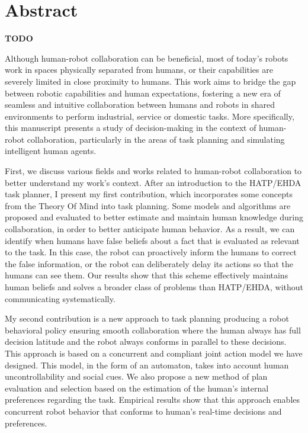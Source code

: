 \chapter*{Abstract}


\textbf{TODO}

Although human-robot collaboration can be beneficial, most of today's robots work in spaces physically separated from humans, or their capabilities are severely limited in close proximity to humans. This work aims to bridge the gap between robotic capabilities and human expectations, fostering a new era of seamless and intuitive collaboration between humans and robots in shared environments to perform industrial, service or domestic tasks. More specifically, this manuscript presents a study of decision-making in the context of human-robot collaboration, particularly in the areas of task planning and simulating intelligent human agents.

First, we discuss various fields and works related to human-robot collaboration to better understand my work's context. After an introduction to the HATP/EHDA task planner, I present my first contribution, which incorporates some concepts from the Theory Of Mind into task planning. Some models and algorithms are proposed and evaluated to better estimate and maintain human knowledge during collaboration, in order to better anticipate human behavior. As a result, we can identify when humans have false beliefs about a fact that is evaluated as relevant to the task. In this case, the robot can proactively inform the humans to correct the false information, or the robot can deliberately delay its actions so that the humans can see them. Our results show that this scheme effectively maintains human beliefs and solves a broader class of problems than HATP/EHDA, without communicating systematically.

My second contribution is a new approach to task planning producing a robot behavioral policy ensuring smooth collaboration where the human always has full decision latitude and the robot always conforms in parallel to these decisions. This approach is based on a concurrent and compliant joint action model we have designed. This model, in the form of an automaton, takes into account human uncontrollability and social cues. We also propose a new method of plan evaluation and selection based on the estimation of the human's internal preferences regarding the task. Empirical results show that this approach enables concurrent robot behavior that conforms to human's real-time decisions and preferences.

